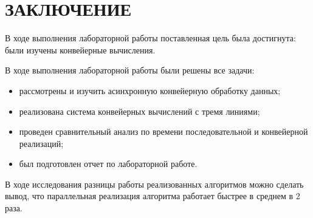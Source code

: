 \section*{ЗАКЛЮЧЕНИЕ}

В ходе выполнения лабораторной работы поставленная цель была достигнута: были изучены конвейерные вычисления.

В ходе выполнения лабораторной работы были решены все задачи:
\begin{itemize}[label*=---]
	\item рассмотрены и изучить асинхронную конвейерную обработку данных;
	\item реализована система конвейерных вычислений с тремя линиями;
	\item проведен сравнительный анализ по времени последовательной и конвейерной реализаций;
	\item был подготовлен отчет по лабораторной работе.
\end{itemize}

В ходе исследования разницы работы реализованных алгоритмов можно сделать вывод, что параллельная реализация алгоритма работает быстрее в среднем в 2 раза. 